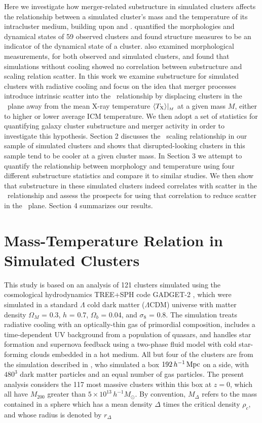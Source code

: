 \documentclass{aastex} \usepackage{natbib}
\begin{document}
Here we investigate how merger-related substructure in simulated
clusters affects the relationship between a simulated cluster's mass
and the temperature of its intracluster medium, building upon
\cite{1995ApJ...452..522B} and \cite{2006ApJ...639...64O}.
\cite{1995ApJ...452..522B} quantified the morphologies and dynamical
states of 59 observed clusters and found structure measures to be an
indicator of the dynamical state of a cluster.
\cite{2006ApJ...639...64O} also examined morphological measurements,
for both observed and simulated clusters, and found that simulations
without cooling showed no correlation between substructure and scaling
relation scatter.  In this work we examine substructure for simulated
clusters with radiative cooling and focus on the idea that merger
processes introduce intrinsic scatter into the \mtx\ relationship by
displacing clusters in the \mtx\ plane away from the mean X-ray
temperature $\langle{T_{\rm X}}\rangle|_{_M}$ at a given mass $M$, either to
higher or lower average ICM temperature.  We then adopt a set of
statistics \citep{1995ApJ...452..522B,2006ApJ...639...64O} for
quantifying galaxy cluster substructure and merger activity in order
to investigate this hypothesis.  Section 2 discusses the \mtx\ scaling
relationship in our sample of simulated clusters and shows that
disrupted-looking clusters in this sample tend to be cooler at a given
cluster mass.  In Section 3 we attempt to quantify the relationship
between morphology and temperature using four different substructure
statistics and compare it to similar studies.  We then show that
substructure in these simulated clusters indeed correlates with
scatter in the \mtx\ relationship and assess the prospects for using
that correlation to reduce scatter in the \mtx\ plane.  Section 4
summarizes our results.

\section{Mass-Temperature Relation in Simulated Clusters}

This study is based on an analysis of 121 clusters simulated using the
cosmological hydrodynamics TREE+SPH code GADGET-2
\citep{2005MNRAS.364.1105S}, which were simulated in a standard
$\Lambda$ cold dark matter ($\Lambda$CDM) universe with matter density
$\Omega_M$ = 0.3, $h$ = 0.7, $\Omega_b$ = 0.04, and $\sigma_8$ = 0.8.
The simulation treats radiative cooling with an optically-thin gas of
primordial composition, includes a time-dependent UV background from a
population of quasars, and handles star formation and supernova
feedback using a two-phase fluid model with cold star-forming clouds
embedded in a hot medium.  All but four of the clusters are from the
simulation described in \cite{2004MNRAS.348.1078B}, who simulated a
box $192 \, h^{-1} \, {\rm Mpc}$ on a side, with $480^3$ dark matter
particles and an equal number of gas particles.  The present analysis
considers the 117 most massive clusters within this box at $z = 0$,
which all have $M_{200}$ greater than $5 \times 10^{13} \, h^{-1}
M_\odot$.  By convention, $M_{\Delta}$ refers to the mass contained in
a sphere which has a mean density $\Delta$ times the critical density
$\rho_c$, and whose radius is denoted by $r_{\Delta}$
\end{document}

